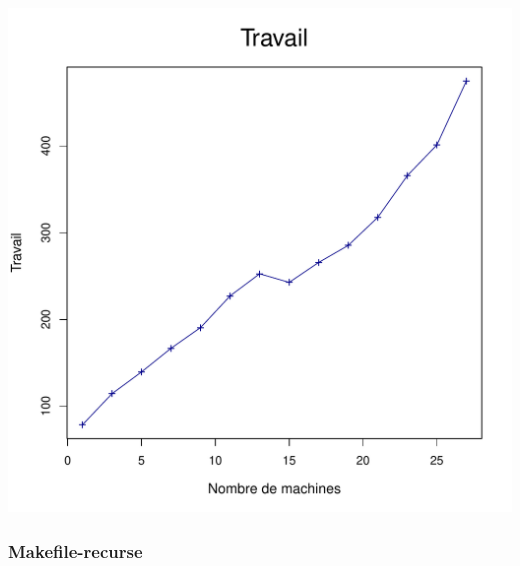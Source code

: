 \documentclass[a4paper, 11pt, titlepage]{article}
\begin{document}
\begin{center}
    \includegraphics[scale=0.45]{res/sujet_makefiles_blender_249_Makefile_nth1_work.pdf}
\end{center}


\subsubsection* {Makefile-recurse}
\end{document}
